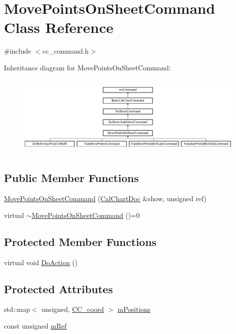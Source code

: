 \hypertarget{a00112}{\section{Move\-Points\-On\-Sheet\-Command Class Reference}
\label{a00112}
}


{\ttfamily \#include $<$cc\-\_\-command.\-h$>$}

Inheritance diagram for Move\-Points\-On\-Sheet\-Command\-:\begin{figure}[H]
\begin{center}
\leavevmode
\includegraphics[height=4.019139cm]{a00112}
\end{center}
\end{figure}
\subsection*{Public Member Functions}
\begin{DoxyCompactItemize}
\item 
\hyperlink{a00112_a88aa5af947bbc26d52c688e6e47f46c2}{Move\-Points\-On\-Sheet\-Command} (\hyperlink{a00020}{Cal\-Chart\-Doc} \&show, unsigned ref)
\item 
virtual \hyperlink{a00112_a368bcc57dc127a648eea88419d382ea6}{$\sim$\-Move\-Points\-On\-Sheet\-Command} ()=0
\end{DoxyCompactItemize}
\subsection*{Protected Member Functions}
\begin{DoxyCompactItemize}
\item 
virtual void \hyperlink{a00112_a2339b105a336b22d59771534a3f4a304}{Do\-Action} ()
\end{DoxyCompactItemize}
\subsection*{Protected Attributes}
\begin{DoxyCompactItemize}
\item 
std\-::map$<$ unsigned, \hyperlink{a00029}{C\-C\-\_\-coord} $>$ \hyperlink{a00112_a53972ae70cedfa512008abc69516e350}{m\-Positions}
\item 
const unsigned \hyperlink{a00112_a4058eda12b7e5ffb059bd1082a0e370b}{m\-Ref}
\end{DoxyCompactItemize}


